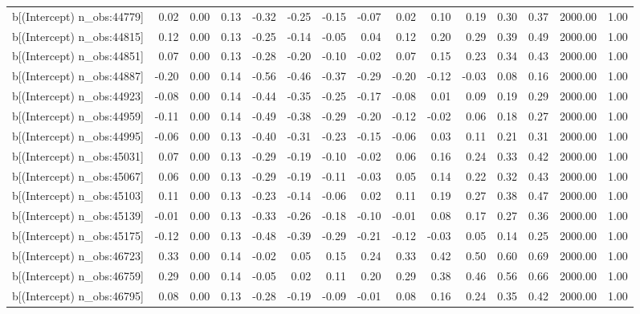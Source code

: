 \begin{table}[ht]
\begin{tabular}{rrrrrrrrrrrrrrr}
  b[(Intercept) n\_obs:44779] & 0.02 & 0.00 & 0.13 & -0.32 & -0.25 & -0.15 & -0.07 & 0.02 & 0.10 & 0.19 & 0.30 & 0.37 & 2000.00 & 1.00 \\ 
  b[(Intercept) n\_obs:44815] & 0.12 & 0.00 & 0.13 & -0.25 & -0.14 & -0.05 & 0.04 & 0.12 & 0.20 & 0.29 & 0.39 & 0.49 & 2000.00 & 1.00 \\ 
  b[(Intercept) n\_obs:44851] & 0.07 & 0.00 & 0.13 & -0.28 & -0.20 & -0.10 & -0.02 & 0.07 & 0.15 & 0.23 & 0.34 & 0.43 & 2000.00 & 1.00 \\ 
  b[(Intercept) n\_obs:44887] & -0.20 & 0.00 & 0.14 & -0.56 & -0.46 & -0.37 & -0.29 & -0.20 & -0.12 & -0.03 & 0.08 & 0.16 & 2000.00 & 1.00 \\ 
  b[(Intercept) n\_obs:44923] & -0.08 & 0.00 & 0.14 & -0.44 & -0.35 & -0.25 & -0.17 & -0.08 & 0.01 & 0.09 & 0.19 & 0.29 & 2000.00 & 1.00 \\ 
  b[(Intercept) n\_obs:44959] & -0.11 & 0.00 & 0.14 & -0.49 & -0.38 & -0.29 & -0.20 & -0.12 & -0.02 & 0.06 & 0.18 & 0.27 & 2000.00 & 1.00 \\ 
  b[(Intercept) n\_obs:44995] & -0.06 & 0.00 & 0.13 & -0.40 & -0.31 & -0.23 & -0.15 & -0.06 & 0.03 & 0.11 & 0.21 & 0.31 & 2000.00 & 1.00 \\ 
  b[(Intercept) n\_obs:45031] & 0.07 & 0.00 & 0.13 & -0.29 & -0.19 & -0.10 & -0.02 & 0.06 & 0.16 & 0.24 & 0.33 & 0.42 & 2000.00 & 1.00 \\ 
  b[(Intercept) n\_obs:45067] & 0.06 & 0.00 & 0.13 & -0.29 & -0.19 & -0.11 & -0.03 & 0.05 & 0.14 & 0.22 & 0.32 & 0.43 & 2000.00 & 1.00 \\ 
  b[(Intercept) n\_obs:45103] & 0.11 & 0.00 & 0.13 & -0.23 & -0.14 & -0.06 & 0.02 & 0.11 & 0.19 & 0.27 & 0.38 & 0.47 & 2000.00 & 1.00 \\ 
  b[(Intercept) n\_obs:45139] & -0.01 & 0.00 & 0.13 & -0.33 & -0.26 & -0.18 & -0.10 & -0.01 & 0.08 & 0.17 & 0.27 & 0.36 & 2000.00 & 1.00 \\ 
  b[(Intercept) n\_obs:45175] & -0.12 & 0.00 & 0.13 & -0.48 & -0.39 & -0.29 & -0.21 & -0.12 & -0.03 & 0.05 & 0.14 & 0.25 & 2000.00 & 1.00 \\ 
  b[(Intercept) n\_obs:46723] & 0.33 & 0.00 & 0.14 & -0.02 & 0.05 & 0.15 & 0.24 & 0.33 & 0.42 & 0.50 & 0.60 & 0.69 & 2000.00 & 1.00 \\ 
  b[(Intercept) n\_obs:46759] & 0.29 & 0.00 & 0.14 & -0.05 & 0.02 & 0.11 & 0.20 & 0.29 & 0.38 & 0.46 & 0.56 & 0.66 & 2000.00 & 1.00 \\ 
  b[(Intercept) n\_obs:46795] & 0.08 & 0.00 & 0.13 & -0.28 & -0.19 & -0.09 & -0.01 & 0.08 & 0.16 & 0.24 & 0.35 & 0.42 & 2000.00 & 1.00 \\ 

\end{tabular}
\end{table}
